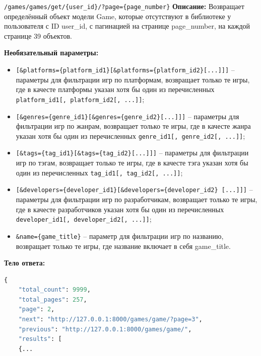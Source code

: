 \documentclass[a4paper,14pt]{extarticle}
\begin{document}
	\begin{getapi}{\texttt{/games/games/get/\{user\_id\}/?page=\{page\_number\}}}
		\textbf{Описание:} Возвращает определённый объект модели Game, которые отсутствуют в библиотеке у пользователя с ID user\_id, с пагинацией на странице page\_number, на каждой странице 39 объектов.\medskip
		
		\textbf{Необязательный параметры:}
		\begin{itemize}
			\item \texttt{[\&platforms=\{platform\_id1\}[\&platforms=\{platform\_id2\}[...]]]} -- параметры для фильтрации игр по платформам, возвращает только те игры, где в качесте платформы указан хотя бы один из перечисленных \texttt{platform\_id1[, platform\_id2[, ...]]};
			\item \texttt{[\&genres=\{genre\_id1\}[\&genres=\{genre\_id2\}[...]]]} -- параметры для фильтрации игр по жанрам, возвращает только те игры, где в качесте жанра указан хотя бы один из перечисленных \texttt{genre\_id1[, genre\_id2[, ...]]};
			\item \texttt{[\&tags=\{tag\_id1\}[\&tags=\{tag\_id2\}[...]]]} -- параметры для фильтрации игр по тэгам, возвращает только те игры, где в качесте тэга указан хотя бы один из перечисленных \texttt{tag\_id1[, tag\_id2[, ...]]};
			\item \texttt{[\&developers=\{developer\_id1\}[\&developers=\{developer\_id2\} [...]]]} -- параметры для фильтрации игр по разработчикам, возвращает только те игры, где в качесте разработчиков указан хотя бы один из перечисленных \texttt{developer\_id1[, developer\_id2[, ...]]};
			\item \texttt{\&name=\{game\_title\}} -- параметр для фильтрации игр по названию, возвращает только те игры, где название включает в себя game\_title.
		\end{itemize}
		
		\textbf{Тело ответа:}
		\begin{lstlisting}[language=Python]
{
    "total_count": 9999,
    "total_pages": 257,
    "page": 2,
    "next": "http://127.0.0.1:8000/games/game/?page=3",
    "previous": "http://127.0.0.1:8000/games/game/",
    "results": [
    {...
		\end{lstlisting}
	\end{getapi}
	
\end{document}
